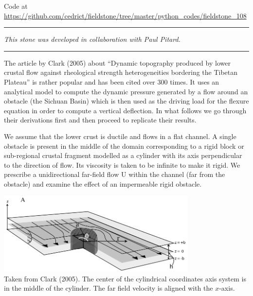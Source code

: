 


\begin{center}
Code at \url{https://github.com/cedrict/fieldstone/tree/master/python_codes/fieldstone_108}
\end{center}

\par\noindent\rule{\textwidth}{0.4pt}

{\sl This stone was developed in collaboration with Paul Pitard.} 

\par\noindent\rule{\textwidth}{0.4pt}


The article by Clark \etal (2005) \cite{clbr05} about ``Dynamic topography produced by lower crustal 
flow against rheological strength heterogeneities bordering the Tibetan Plateau'' 
is rather popular and has been cited over 300 times. It uses an analytical model to compute the 
dynamic pressure generated by a flow around an obstacle (the Sichuan Basin) which is then 
used as the driving load for the flexure equation in 
order to compute a vertical deflection. In what follows we go through their derivations first and 
then proceed to replicate their results.  

We assume that the lower crust is ductile and flows in a flat channel. A single obstacle is present in 
the middle of the domain corresponding to a rigid block or sub-regional crustal fragment modelled as 
a cylinder with its axis perpendicular to the direction of flow.
Its viscosity is taken to be infinite to make it rigid. 
We prescribe a unidirectional far-field flow U within the channel (far from the obstacle) 
and examine the effect of an impermeable rigid obstacle. 

\begin{center}
\includegraphics[width=10cm]{python_codes/fieldstone_108/images/clbr05a}\\
{\captionfont 
Taken from Clark \etal (2005). The center of the cylindrical coordinates axis system is in the middle of the cylinder.  
The far field velocity is aligned with the $x$-axis.}
\end{center}

